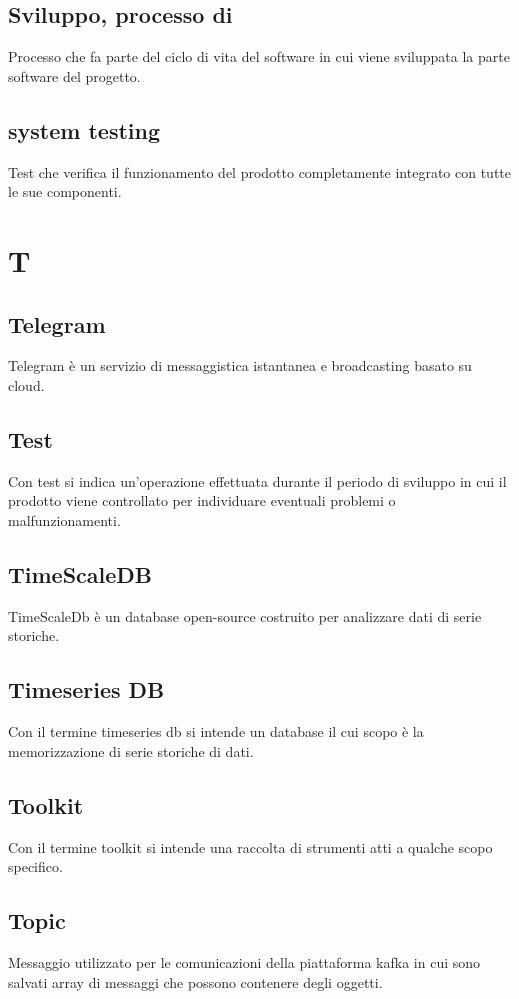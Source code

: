 \subsection{Sviluppo, processo di }  Processo che fa parte del ciclo di vita del software in cui viene sviluppata la parte software del progetto.
\subsection{system testing}  Test che verifica il funzionamento del prodotto completamente integrato con tutte le sue componenti.

\newpage \section{T}
\subsection{Telegram}  Telegram è un servizio di messaggistica istantanea e broadcasting basato su cloud.
\subsection{Test }  Con test si indica un'operazione effettuata durante il periodo di sviluppo in cui il prodotto viene controllato per individuare eventuali problemi o malfunzionamenti.
\subsection{TimeScaleDB}  TimeScaleDb è un database open-source costruito per analizzare dati di serie storiche.
\subsection{Timeseries DB}  Con il termine timeseries db si intende un database il cui scopo è la memorizzazione di serie storiche di dati.
\subsection{Toolkit}  Con il termine toolkit si intende una raccolta di strumenti atti a qualche scopo specifico.
\subsection{Topic }  Messaggio utilizzato per le comunicazioni della piattaforma kafka in cui sono salvati array di messaggi che possono contenere degli oggetti.
